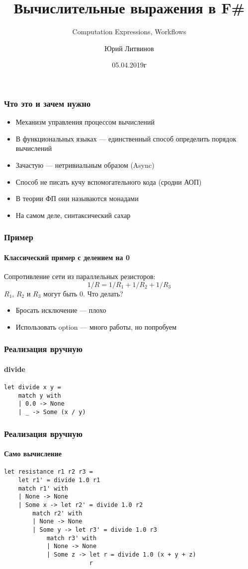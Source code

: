 \documentclass[xetex,mathserif,serif]{beamer}
\title{Вычислительные выражения в F\#}
\subtitle{Computation Expressions, Workflows}
\author{Юрий Литвинов}
\date{05.04.2019г}
\begin{document}
	
	\frame{\titlepage}
	
	\begin{frame}
		\frametitle{Что это и зачем нужно}
		\begin{itemize}
			\item Механизм управления процессом вычислений
			\item В функциональных языках --- единственный способ определить порядок вычислений
			\item Зачастую --- нетривиальным образом (Async)
			\item Способ не писать кучу вспомогательного кода (сродни АОП)
			\item В теории ФП они называются монадами
			\item На самом деле, синтаксический сахар
		\end{itemize}
	\end{frame}

	\begin{frame}
		\frametitle{Пример}
		\framesubtitle{Классический пример с делением на 0}
		Сопротивление сети из параллельных резисторов:
		$$1/R = 1/R_1 + 1/R_2 + 1/R_3$$
		$R_1$, $R_2$ и $R_3$ могут быть 0. Что делать?
		\begin{itemize}
			\item Бросать исключение --- плохо
			\item Использовать option --- много работы, но попробуем
		\end{itemize}
	\end{frame}

	\begin{frame}[fragile]
		\frametitle{Реализация вручную}
		\framesubtitle{divide}
		\begin{verbatim}
let divide x y =
    match y with
    | 0.0 -> None
    | _ -> Some (x / y)
		\end{verbatim}
	\end{frame}

	\begin{frame}[fragile]
		\frametitle{Реализация вручную}
		\framesubtitle{Само вычисление}
		\begin{verbatim}
let resistance r1 r2 r3 =
    let r1' = divide 1.0 r1
    match r1' with
    | None -> None
    | Some x -> let r2' = divide 1.0 r2
        match r2' with
        | None -> None
        | Some y -> let r3' = divide 1.0 r3
            match r3' with
            | None -> None
            | Some z -> let r = divide 1.0 (x + y + z)
                        r
		\end{verbatim}
	\end{frame}
\end{document}
